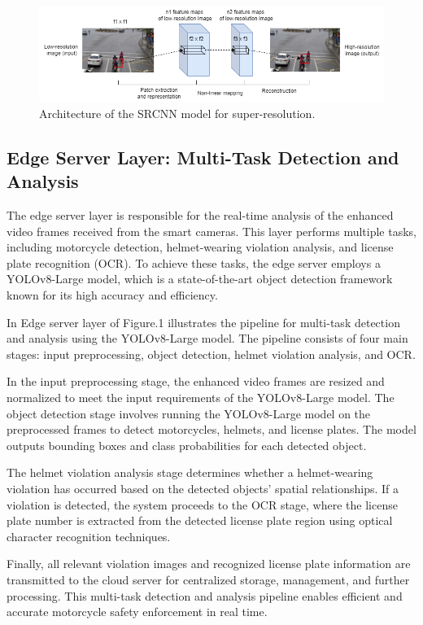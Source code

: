 \documentclass[conference]{IEEEtran}
\begin{document}
\begin{figure}[!h]
    \centering
    \includegraphics[width=1\linewidth]{images/srcnn.png}
    \caption{Architecture of the SRCNN model for super-resolution.}
    \label{fig:srcnn_overview}
\end{figure}

\subsection{Edge Server Layer: Multi-Task Detection and Analysis}
\label{subsec:edge_server}

The edge server layer is responsible for the real-time analysis of the enhanced video frames received from the smart cameras. This layer performs multiple tasks, including motorcycle detection, helmet-wearing violation analysis, and license plate recognition (OCR). To achieve these tasks, the edge server employs a YOLOv8-Large model, which is a state-of-the-art object detection framework known for its high accuracy and efficiency.

In Edge server layer of Figure.1 illustrates the pipeline for multi-task detection and analysis using the YOLOv8-Large model. The pipeline consists of four main stages: input preprocessing, object detection, helmet violation analysis, and OCR.

In the input preprocessing stage, the enhanced video frames are resized and normalized to meet the input requirements of the YOLOv8-Large model. The object detection stage involves running the YOLOv8-Large model on the preprocessed frames to detect motorcycles, helmets, and license plates. The model outputs bounding boxes and class probabilities for each detected object.

The helmet violation analysis stage determines whether a helmet-wearing violation has occurred based on the detected objects' spatial relationships. If a violation is detected, the system proceeds to the OCR stage, where the license plate number is extracted from the detected license plate region using optical character recognition techniques.

Finally, all relevant violation images and recognized license plate information are transmitted to the cloud server for centralized storage, management, and further processing. This multi-task detection and analysis pipeline enables efficient and accurate motorcycle safety enforcement in real time.
\end{document}
